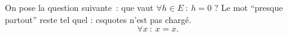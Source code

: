 On pose la question suivante~: que vaut $\forall h \in E ~:~ h = 0$ ?
Le mot ``presque partout'' reste tel quel : csquotes n'est pas chargé.
\[
  \forall x ~:~ x = x.
\]
